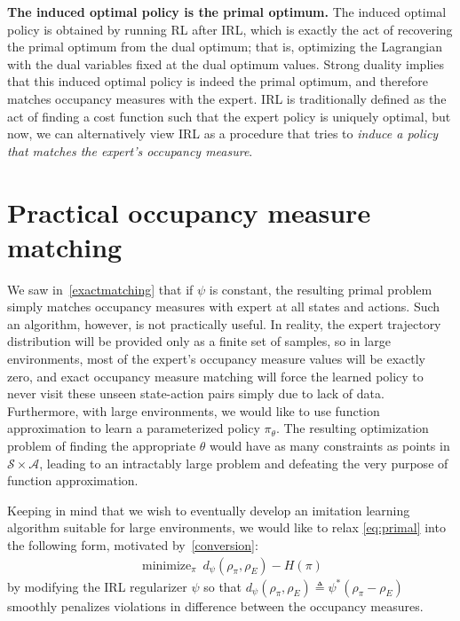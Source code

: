 \documentclass{article}
\newcommand\calS{\ensuremath{\mathcal{S}}}
\newcommand\calA{\ensuremath{\mathcal{A}}}
\DeclareMathOperator*{\minimize}{minimize}
\newcommand{\1}{\mathbb{I}} %
\begin{document}
\textbf{The induced optimal policy is the primal optimum.} The induced optimal policy is obtained by running RL after IRL, which is exactly the act of recovering the primal optimum from the dual optimum; that is,  optimizing the Lagrangian with the dual variables fixed at the dual optimum values.
Strong duality implies that this induced optimal policy is indeed the primal optimum, and therefore matches occupancy measures with the expert.
IRL is traditionally defined as the act of finding a cost function such that the expert policy is uniquely optimal, but now,
we can alternatively view IRL as a procedure that tries to \emph{induce a policy that matches the expert's occupancy measure}.

\section{Practical occupancy measure matching}
\label{sec:practical}
We saw in~\cref{exactmatching} that if $\psi$ is constant, the resulting primal problem  simply matches occupancy measures with expert at all states and actions.
Such an algorithm, however, is not practically useful.
In reality, the expert trajectory distribution will be provided only as a finite set of samples, so in large environments, most of the expert's occupancy measure values will be exactly zero, and exact occupancy measure matching will force the learned policy to never visit these unseen state-action pairs simply due to lack of data.
Furthermore, with large environments, we would like to use function approximation to learn a parameterized policy $\pi_\theta$.
The resulting optimization problem of finding the appropriate $\theta$ would have as many constraints as points in $\calS\times\calA$, leading to an intractably large problem and defeating the very purpose of function approximation.

Keeping in mind that we wish to eventually develop an imitation learning algorithm suitable for large environments, we would like to relax \cref{eq:primal} into the following form, motivated by~\cref{conversion}:
\begin{align}
\minimize_\pi\ d_\psi(\rho_\pi, \rho_E) - H(\pi) \label{eq:costobjective}
\end{align}
by modifying the IRL regularizer $\psi$ so that $d_\psi(\rho_\pi, \rho_E) \triangleq \psi^*(\rho_\pi - \rho_E)$ smoothly penalizes violations in difference between the occupancy measures.
\end{document}
